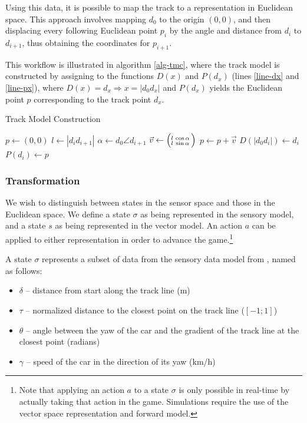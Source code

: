 \documentclass[conference]{IEEEtran}
\newcommand{\vect}[2]{\ensuremath{\Bigl(\negthinspace\begin{smallmatrix}#1\\#2\end{smallmatrix}}\Bigr)}
\begin{document}
Using this data, it is possible to map the track to a representation in Euclidean space. This approach involves mapping $d_0$ to the origin $(0,0)$, and then displacing every following Euclidean point $p_i$ by the angle and distance from $d_i$ to $d_{i+1}$, thus obtaining the coordinates for $p_{i+1}$.

This workflow is illustrated in algorithm \ref{alg-tmc}, where the track model is constructed by assigning to the functions $D(x)$ and $P(d_x)$ (lines \ref{line-dx} and \ref{line-px}), where $D(x)=d_x \Rightarrow x=|d_0 d_x|$ and $P(d_x)$ yields the Euclidean point $p$ corresponding to the track point $d_x$.

\begin{algorithm}
\caption{Track Model Construction}
\label{alg-tmc}
\begin{algorithmic}[1]
\State $p \gets (0,0)$
	\State $l \gets |d_i d_{i+1}|$
	\State $\alpha \gets d_0 \angle d_{i+1}$
	\State $\vec{v} \gets \vect{l & \cos{\alpha}}{l & \sin{\alpha}}$
	\State $p \gets p+\vec{v}$
	\State $D(|d_0 d_i|) \gets d_i$ \label{line-dx}
	\State $P(d_i) \gets p$ \label{line-px}
\EndFor
\end{algorithmic}
\end{algorithm}

\subsubsection{Transformation}
\label{sec-trans}
We wish to distinguish between states in the sensor space and those in the Euclidean space. We define a state $\sigma$ as being represented in the sensory model, and a state $s$ as being represented in the vector model. An action $a$ can be applied to either representation in order to advance the game.\footnote{Note that applying an action $a$ to a state $\sigma$ is only possible in real-time by actually taking that action in the game. Simulations require the use of the vector space representation and forward model.}

A state $\sigma$ represents a subset of data from the sensory data model from \cite{manual}, named as follows:
\begin{itemize}
\item $\delta$ -- distance from start along the track line (m)
\item $\tau$ -- normalized distance to the closest point on the track line ($[-1;1]$)
\item $\theta$ -- angle between the yaw of the car and the gradient of the track line at the closest point (radians)
\item $\gamma$ -- speed of the car in the direction of its yaw (km/h)
\end{itemize}
\end{document}
